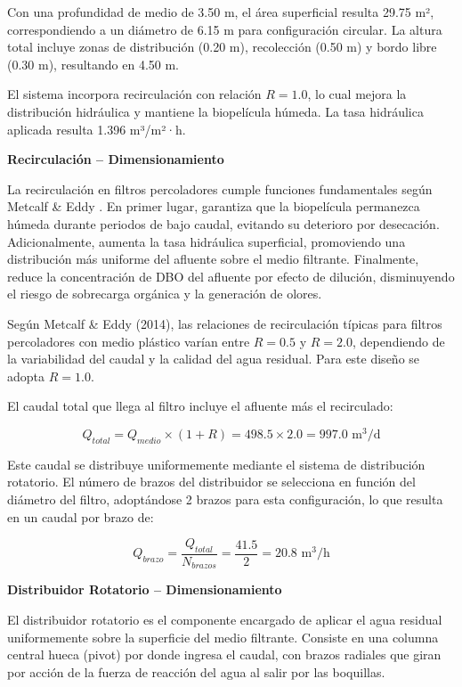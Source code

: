 \documentclass[12pt,a4paper]{article}
\begin{document}
Con una profundidad de medio de 3.50 m, el área superficial resulta 29.75 m², correspondiendo a un diámetro de 6.15 m para configuración circular. La altura total incluye zonas de distribución (0.20 m), recolección (0.50 m) y bordo libre (0.30 m), resultando en 4.50 m.

El sistema incorpora recirculación con relación $R = 1.0$, lo cual mejora la distribución hidráulica y mantiene la biopelícula húmeda. La tasa hidráulica aplicada resulta 1.396 m³/m²·h.

\textbf{Recirculación -- Dimensionamiento}

La recirculación en filtros percoladores cumple funciones fundamentales según Metcalf \& Eddy \cite{metcalf2014}. En primer lugar, garantiza que la biopelícula permanezca húmeda durante periodos de bajo caudal, evitando su deterioro por desecación. Adicionalmente, aumenta la tasa hidráulica superficial, promoviendo una distribución más uniforme del afluente sobre el medio filtrante. Finalmente, reduce la concentración de DBO del afluente por efecto de dilución, disminuyendo el riesgo de sobrecarga orgánica y la generación de olores.

Según Metcalf \& Eddy (2014), las relaciones de recirculación típicas para filtros percoladores con medio plástico varían entre $R = 0.5$ y $R = 2.0$, dependiendo de la variabilidad del caudal y la calidad del agua residual. Para este diseño se adopta $R = 1.0$.

El caudal total que llega al filtro incluye el afluente más el recirculado:

\begin{equation}
Q_{total} = Q_{medio} \times (1 + R) = 498.5 \times 2.0 = 997.0 \text{ m}^3\text{/d}
\end{equation}

Este caudal se distribuye uniformemente mediante el sistema de distribución rotatorio. El número de brazos del distribuidor se selecciona en función del diámetro del filtro, adoptándose 2 brazos para esta configuración, lo que resulta en un caudal por brazo de:

\begin{equation}
Q_{brazo} = \frac{Q_{total}}{N_{brazos}} = \frac{41.5}{2} = 20.8 \text{ m}^3\text{/h}
\end{equation}

\textbf{Distribuidor Rotatorio -- Dimensionamiento}

El distribuidor rotatorio es el componente encargado de aplicar el agua residual uniformemente sobre la superficie del medio filtrante. Consiste en una columna central hueca (pivot) por donde ingresa el caudal, con brazos radiales que giran por acción de la fuerza de reacción del agua al salir por las boquillas.
\end{document}
